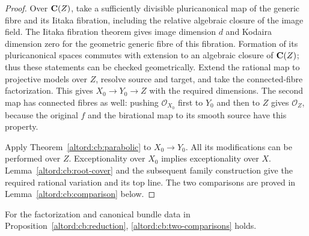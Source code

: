 \begin{proof}
Over \(\mathbf C(Z)\), take a sufficiently divisible pluricanonical map
of the generic fibre and its Iitaka fibration, including the
relative algebraic closure of the image field.
The Iitaka fibration theorem gives image dimension \(d\) and
Kodaira dimension zero for the geometric generic fibre of this
fibration.  Formation of its pluricanonical spaces commutes with
extension to an algebraic closure of \(\mathbf C(Z)\); thus these
statements can be checked geometrically.
Extend the rational map to projective models over \(Z\), resolve
source and target, and take the connected-fibre factorization.
This gives \(X_0\to Y_0\to Z\) with the required dimensions.
The second map has connected fibres as well: pushing
\(\mathcal O_{X_0}\) first to \(Y_0\) and then to \(Z\) gives
\(\mathcal O_Z\), because the original \(f\) and the birational
map to its smooth source have this property.

Apply Theorem~\ref{altord:cb:parabolic} to \(X_0\to Y_0\).
All its modifications can be performed over \(Z\).
Exceptionality over \(X_0\) implies exceptionality over \(X\).
Lemma~\ref{altord:cb:root-cover} and the subsequent family construction
give the required rational variation and its top line.
The two comparisons are proved in Lemma~\ref{altord:cb:comparison}
below.
\end{proof}

\begin{lemma}
\label{altord:cb:comparison}
For the factorization and canonical bundle data in
Proposition~\ref{altord:cb:reduction}, \eqref{altord:cb:two-comparisons} holds.
\end{lemma}

